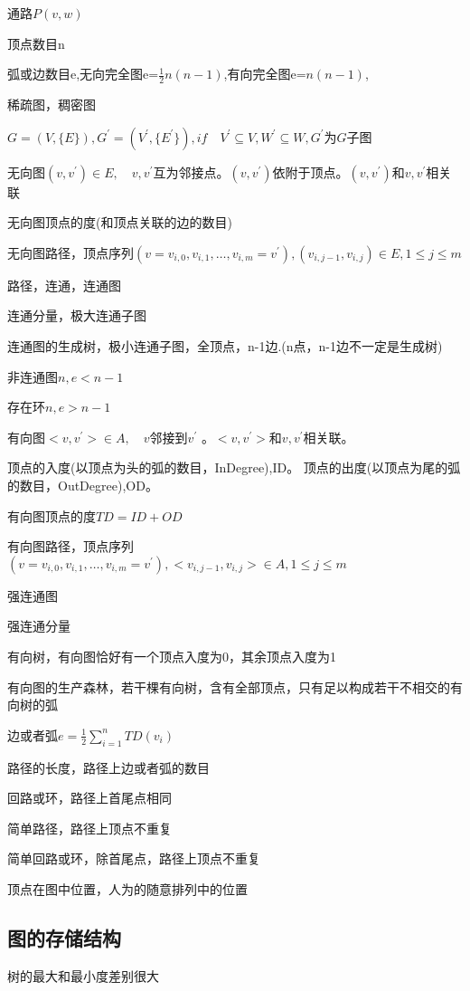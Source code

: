 \documentclass[UTF8]{ctexart}
\newcommand{\mt}[1]{\text{#1}}
\newcommand{\q}{\quad}
\newcommand{\qa}{\vspace{12 pt}}
\begin{document}
通路$P(v,w)$

顶点数目n

弧或边数目e,无向完全图e=$\frac{1}{2}n(n-1)$,有向完全图e=$n(n-1)$,

稀疏图，稠密图

$G=(V,\{E\}),G^{'}=(V^{'},\{E^{'}\}),if \q V^{'} \subseteq V,W^{'} \subseteq W,G^{'}\mt{为} G\mt{子图}$

\qa

无向图$(v,v^{'}) \in E,\q v,v^{'}$互为邻接点。$(v,v^{'})$依附于顶点。$(v,v^{'}) \mt{和}v,v^{'}$相关联

无向图顶点的度(和顶点关联的边的数目)

无向图路径，顶点序列$(v=v_{i,0},v_{i,1},\dots,v_{i,m}=v^{'}),(v_{i,j-1},v_{i,j}) \in E,1\leqslant j\leqslant m$

路径，连通，连通图

连通分量，极大连通子图

连通图的生成树，极小连通子图，全顶点，n-1边.(n点，n-1边不一定是生成树)

非连通图$n,e<n-1$

存在环$n,e>n-1$


\qa

有向图$<v,v^{'}> \in A,\q v$邻接到$v^{'}$ 。$<v,v^{'}> \mt{和}v,v^{'}$相关联。

顶点的入度(以顶点为头的弧的数目，InDegree),ID。 顶点的出度(以顶点为尾的弧的数目，OutDegree),OD。

有向图顶点的度$TD=ID+OD$

有向图路径，顶点序列$(v=v_{i,0},v_{i,1},\dots,v_{i,m}=v^{'}),<v_{i,j-1},v_{i,j}> \in A,1\leqslant j\leqslant m$

强连通图

强连通分量

有向树，有向图恰好有一个顶点入度为0，其余顶点入度为1

有向图的生产森林，若干棵有向树，含有全部顶点，只有足以构成若干不相交的有向树的弧



\qa

边或者弧$e=\frac{1}{2}\sum_{i=1}^n TD(v_i)$ 

路径的长度，路径上边或者弧的数目

回路或环，路径上首尾点相同

简单路径，路径上顶点不重复

简单回路或环，除首尾点，路径上顶点不重复

顶点在图中位置，人为的随意排列中的位置

\subsection{图的存储结构}
树的最大和最小度差别很大
\end{document}
